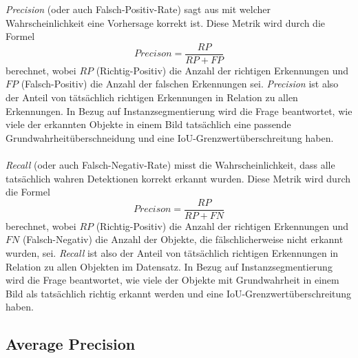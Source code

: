 \textit{Precision} (oder auch Falsch-Positiv-Rate) sagt aus mit welcher Wahrscheinlichkeit eine Vorhersage korrekt ist. Diese Metrik wird durch die Formel 
\begin{equation}\label{equation:precision}
  Precison = \frac{RP}{RP + FP}
\end{equation}
berechnet, wobei $RP$ (Richtig-Positiv) die Anzahl der richtigen Erkennungen und $FP$ (Falsch-Positiv) die Anzahl der falschen Erkennungen sei.\cite{ref:map} \textit{Precision} ist also der Anteil von tätsächlich richtigen Erkennungen in Relation zu allen Erkennungen. In Bezug auf Instanzsegmentierung wird die Frage beantwortet, wie viele der erkannten Objekte in einem Bild tatsächlich eine passende Grundwahrheitüberschneidung und eine IoU-Grenzwertüberschreitung haben.\cite{ref:jordan}
\\\\
\textit{Recall} (oder auch Falsch-Negativ-Rate) misst die Wahrscheinlichkeit, dass alle tatsächlich wahren Detektionen korrekt erkannt wurden. Diese Metrik wird durch die Formel 
\begin{equation}\label{equation:recall}
  Precison = \frac{RP}{RP + FN}
\end{equation}
berechnet, wobei $RP$ (Richtig-Positiv) die Anzahl der richtigen Erkennungen und $FN$ (Falsch-Negativ) die Anzahl der Objekte, die fälschlicherweise nicht erkannt wurden, sei. \textit{Recall} ist also der Anteil von tätsächlich richtigen Erkennungen in Relation zu allen Objekten im Datensatz.\cite{ref:map} In Bezug auf Instanzsegmentierung wird die Frage beantwortet, wie viele der Objekte mit Grundwahrheit in einem Bild als tatsächlich richtig erkannt werden und eine IoU-Grenzwertüberschreitung haben.\cite{ref:jordan}

\subsection{Average Precision}

